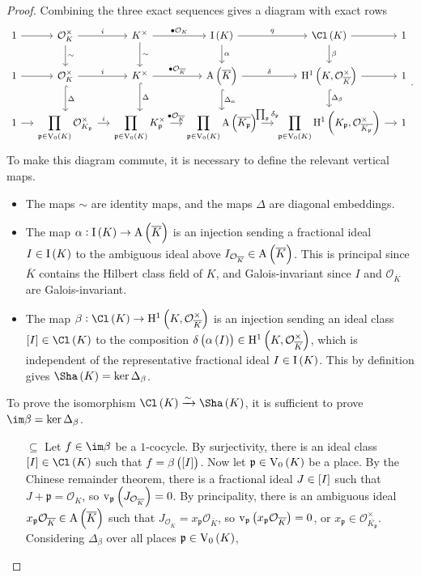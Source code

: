 \documentclass{article}
\newcommand{\br}{\del}                              %
\newcommand{\OOO}{\mathcal{O}} %
\newcommand{\ppp}{\mathfrak{p}}   %
\newcommand{\A}{\mathrm{A}}   %
\renewcommand{\H}{\mathrm{H}} %
\newcommand{\I}{\mathrm{I}}   %
\newcommand{\V}{\mathrm{V}}   %
\renewcommand{\v}{\mathrm{v}} %
\begin{document}
\begin{proof}
Combining the three exact sequences gives a diagram with exact rows
$$
\begin{tikzcd}[column sep=small]
1 \arrow{r} & \OOO_K^\times \arrow{r}{i} \arrow{d}{\sim} & K^\times \arrow{r}{\bullet\OOO_K} \arrow{d}{\sim} & \I\br{K} \arrow{r}{q} \arrow{d}{\alpha} & \Cl\br{K} \arrow{r} \arrow{d}{\beta} & 1 \\
1 \arrow{r} & \OOO_K^\times \arrow{r}{i} \arrow[hookrightarrow]{d}{\Delta} & K^\times \arrow{r}{\bullet\OOO_{\overline{K}}} \arrow[hookrightarrow]{d}{\Delta} & \A\br{\overline{K}} \arrow{r}{\delta} \arrow[hookrightarrow]{d}{\Delta_\alpha} & \H^1\br{K, \OOO_{\overline{K}}^\times} \arrow{r} \arrow[hookrightarrow]{d}{\Delta_\beta} & 1 \\
1 \arrow{r} & \displaystyle\prod_{\ppp \in \V_0\br{K}} \OOO_{K_\ppp}^\times \arrow{r}{i} & \displaystyle\prod_{\ppp \in \V_0\br{K}} K_\ppp^\times \arrow{r}{\bullet\OOO_{\overline{K}}} & \displaystyle\prod_{\ppp \in \V_0\br{K}} \A\br{\overline{K_\ppp}} \arrow{r}{\prod_\ppp \delta_\ppp} & \displaystyle\prod_{\ppp \in \V_0\br{K}} \H^1\br{K_\ppp, \OOO_{\overline{K_\ppp}}^\times} \arrow{r} & 1
\end{tikzcd}.
$$
To make this diagram commute, it is necessary to define the relevant vertical maps.
\begin{itemize}
\item The maps $ \sim $ are identity maps, and the maps $ \Delta $ are diagonal embeddings.
\item The map $ \alpha : \I\br{K} \to \A\br{\overline{K}} $ is an injection sending a fractional ideal $ I \in \I\br{K} $ to the ambiguous ideal above $ I_{\OOO_{\overline{K}}} \in \A\br{\overline{K}} $. This is principal since $ \overline{K} $ contains the Hilbert class field of $ K $, and Galois-invariant since $ I $ and $ \OOO_{\overline{K}} $ are Galois-invariant.
\item The map $ \beta : \Cl\br{K} \to \H^1\br{K, \OOO_{\overline{K}}^\times} $ is an injection sending an ideal class $ \sbr{I} \in \Cl\br{K} $ to the composition $ \delta\br{\alpha\br{I}} \in \H^1\br{K, \OOO_{\overline{K}}^\times} $, which is independent of the representative fractional ideal $ I \in \I\br{K} $. This by definition gives $ \Sha\br{K} = \ker \Delta_\beta $.
\end{itemize}
To prove the isomorphism $ \Cl\br{K} \xrightarrow{\sim} \Sha\br{K} $, it is sufficient to prove $ \im \beta = \ker \Delta_\beta $.
\begin{itemize}
\item[$ \subseteq $] Let $ f \in \im \beta $ be a $ 1 $-cocycle. By surjectivity, there is an ideal class $ \sbr{I} \in \Cl\br{K} $ such that $ f = \beta\br{\sbr{I}} $. Now let $ \ppp \in \V_0\br{K} $ be a place. By the Chinese remainder theorem, there is a fractional ideal $ J \in \sbr{I} $ such that $ J + \ppp = \OOO_K $, so $ \v_\ppp\br{J_{\OOO_{\overline{K}}}} = 0 $. By principality, there is an ambiguous ideal $ x_\ppp\OOO_{\overline{K}} \in \A\br{\overline{K}} $ such that $ J_{\OOO_{\overline{K}}} = x_\ppp\OOO_{\overline{K}} $, so $ \v_\ppp\br{x_\ppp\OOO_{\overline{K}}} = 0 $, or $ x_\ppp \in \OOO_{\overline{K_\ppp}}^\times $. Considering $ \Delta_\beta $ over all places $ \ppp \in \V_0\br{K} $,

\end{itemize}
\end{proof}
\end{document}
